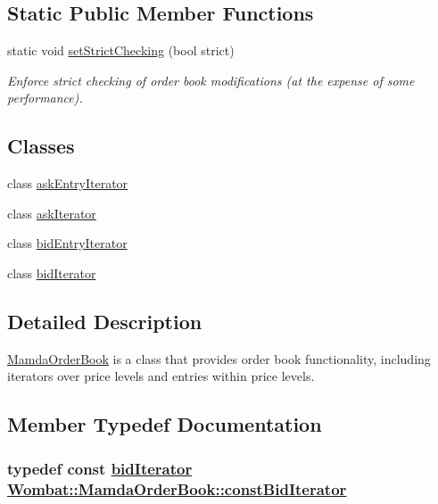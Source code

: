 \subsection*{Static Public Member Functions}
\begin{CompactItemize}
\item 
static void \hyperlink{classWombat_1_1MamdaOrderBook_469f47b99322ce6b9e002429a75a8efd}{set\-Strict\-Checking} (bool strict)
\begin{CompactList}\small\item\em Enforce strict checking of order book modifications (at the expense of some performance). \item\end{CompactList}\end{CompactItemize}
\subsection*{Classes}
\begin{CompactItemize}
\item 
class \hyperlink{classWombat_1_1MamdaOrderBook_1_1askEntryIterator}{ask\-Entry\-Iterator}
\item 
class \hyperlink{classWombat_1_1MamdaOrderBook_1_1askIterator}{ask\-Iterator}
\item 
class \hyperlink{classWombat_1_1MamdaOrderBook_1_1bidEntryIterator}{bid\-Entry\-Iterator}
\item 
class \hyperlink{classWombat_1_1MamdaOrderBook_1_1bidIterator}{bid\-Iterator}
\end{CompactItemize}


\subsection{Detailed Description}
\hyperlink{classWombat_1_1MamdaOrderBook}{Mamda\-Order\-Book} is a class that provides order book functionality, including iterators over price levels and entries within price levels. 



\subsection{Member Typedef Documentation}
\hypertarget{classWombat_1_1MamdaOrderBook_dd118d4eb3fe29c05849edcf44adbe82}{
\subsubsection[constBidIterator]{\setlength{\rightskip}{0pt plus 5cm}typedef const \hyperlink{classWombat_1_1MamdaOrderBook_1_1bidIterator}{bid\-Iterator} \hyperlink{classWombat_1_1MamdaOrderBook_1_1bidIterator}{Wombat::Mamda\-Order\-Book::const\-Bid\-Iterator}}}
\label{classWombat_1_1MamdaOrderBook_dd118d4eb3fe29c05849edcf44adbe82}


